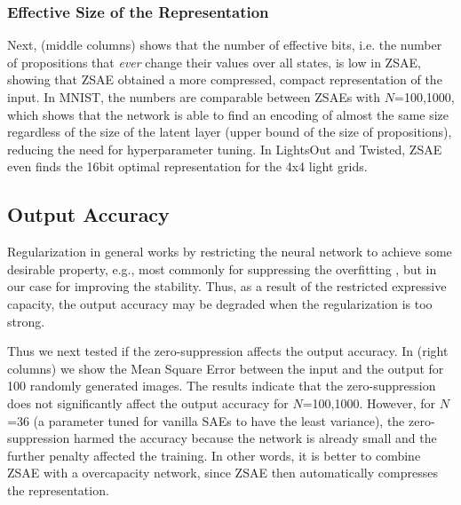\subsubsection{Effective Size of the Representation}

Next,  (middle columns) shows that the number of effective bits,
i.e. the number of propositions that \emph{ever} change their values over all states, is low in ZSAE, showing that
ZSAE obtained a more compressed, compact representation of the input.
In MNIST, the numbers are comparable between ZSAEs with $N$=100,1000,
which shows that the network is able to find an encoding of almost the same size
regardless of the size of the latent layer (upper bound of the size of
propositions), reducing the need for hyperparameter tuning.
In LightsOut and Twisted, ZSAE even finds the 16bit optimal representation for the 4x4 light grids.


\subsection{Output Accuracy}

Regularization in general works by restricting the neural network
to achieve some desirable property, e.g., most commonly for suppressing the overfitting \cite[chap.5]{Goodfellow-et-al-2016}, but in our case
for improving the stability. Thus, as a result of the restricted expressive capacity, the output accuracy may be degraded
when the regularization is too strong.

Thus we next tested if the zero-suppression affects the output accuracy.
In  (right columns)
we show the Mean Square Error between the input and the output
for 100 randomly generated images.
The results indicate that the zero-suppression does not significantly affect the output accuracy for $N$=100,1000.
However, for $N$=36 (a parameter tuned for vanilla SAEs to have the least variance), the zero-suppression
harmed the accuracy because the network is already small and the further penalty affected the training.
In other words, it is better to combine ZSAE with a overcapacity network,
since ZSAE then automatically compresses the representation.

